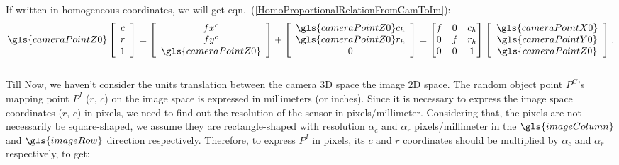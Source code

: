 \noindent
If written in homogeneous coordinates, we will get eqn.~(\ref{HomoProportionalRelationFromCamToIm}):
\begin{equation}
%
\gls{cameraPointZ0} \left[ \begin{array}{c} c \\ r \\ 1 \end{array} \right] %
= %
\left[ \begin{array}{c} fx^c \\ fy^c \\ \gls{cameraPointZ0} \end{array} \right]%
+
\left[ \begin{array}{c}  \gls{cameraPointZ0}c_h \\  \gls{cameraPointZ0}r_h \\ 0\end{array} \right] %
=  \begin{bmatrix} f & 0 &  c_h  \\ 0 & f & r_h \\ 0 & 0 & 1 \end{bmatrix}%
\left[ \begin{array}{c} \gls{cameraPointX0} \\ \gls{cameraPointY0} \\ \gls{cameraPointZ0} \end{array} \right] .%
\label{HomoProportionalRelationFromCamToIm}
\end{equation}%
%
\\\indent
Till Now, we haven't consider the units translation between the camera \gls{3D} space the image 2D space. The random object point \(P^C\)'s mapping point \(P^I\) (\(r, \, c\)) on the image space is expressed in millimeters (or inches). Since it is necessary to express the image space coordinates (\(r, \, c\)) in pixels, we need to find out the resolution of the sensor in pixels/millimeter. Considering that, the pixels are not necessarily be square-shaped, we assume they are rectangle-shaped with resolution  $\alpha_c$ and \(\alpha_r\) pixels/millimeter in the \(\gls{imageColumn}\) and \(\gls{imageRow}\) direction respectively. Therefore, to express \(P^I\) in pixels, its \(c\) and \(r\) coordinates should be multiplied by \(\alpha_c\) and \(\alpha_r\) respectively, to get:
%

